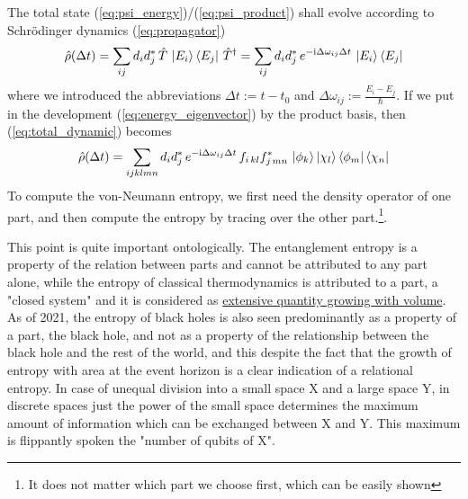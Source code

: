 \documentclass[12pt]{article}
\begin{document}
The total state (\ref{eq:psi_energy})/(\ref{eq:psi_product}) shall evolve according to Schrödinger dynamics (\ref{eq:propagator})
\begin{equation}
\label{eq:total_dynamic}
\hat{\rho}(\Delta t)=\sum_{ij}d_{i}d_{j}^*\, \hat{T}\, \ket{E_i}\bra{E_j}\, {\hat{T}}^\dagger
= \sum_{ij}d_{i}d_{j}^*\, e^{-\mathrm i \Delta\omega_{ij}\Delta t}\, \ket{E_i}\bra{E_j}
\end{equation}
where we introduced the abbreviations $\Delta t := t-t_0$ and $\Delta \omega_{ij} := \frac{E_i - E_j}{\hbar}$. If we put in the development (\ref{eq:energy_eigenvector}) by the product basis, then (\ref{eq:total_dynamic}) becomes 
\begin{equation*}
\hat{\rho}(\Delta t) = \sum_{ijklmn}d_{i}d_{j}^*\, e^{-\mathrm i \Delta\omega_{ij}\Delta t}\, 
f_{i\,kl}f_{j\,mn}^*\, \ket{\phi_k}\ket{\chi_l}\bra{\phi_m}\bra{\chi_n}
\end{equation*}
To compute the von-Neumann entropy, we first need the density operator of one part, and then compute the entropy by tracing over the other part.\footnote{It does not matter which part we choose first, which can be easily shown}.

This point is quite important ontologically. The entanglement entropy is a property of the relation between parts and cannot be attributed to any part alone, while the entropy of classical thermodynamics is attributed to a part, a "closed system" and it is considered as \href{https://de.wikipedia.org/wiki/Extensive_Gr%C3%B6%C3%9Fe}{extensive quantity growing with volume}. As of 2021, the entropy of black holes is also seen predominantly as a property of a part, the black hole, and not as a property of the relationship between the black hole and the rest of the world, and this despite the fact that the growth of entropy with area at the event horizon is a clear indication of a relational entropy. In case of unequal division into a small space X and a large space Y, in discrete spaces just the power of the small space determines the maximum amount of information which can be exchanged between X and Y. This maximum is flippantly spoken the "number of qubits of X".
\end{document}
